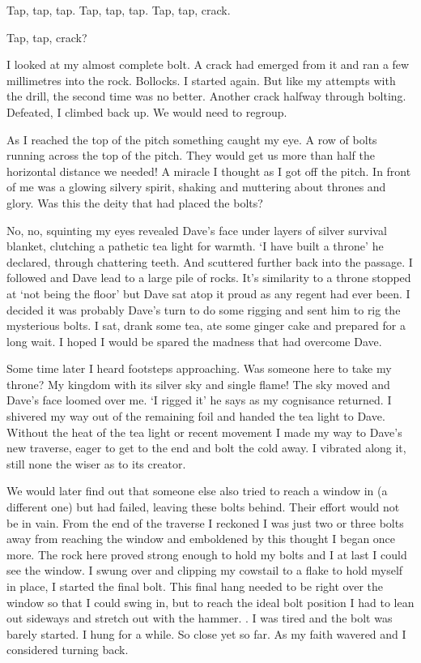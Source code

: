 Tap, tap, tap. Tap, tap, tap. Tap, tap, crack. 

Tap, tap, crack? 

I looked at my almost complete bolt. A crack had emerged from it and ran a few millimetres into the rock. Bollocks. I started again. But like my attempts with the drill, the second time was no better. Another crack halfway through bolting. Defeated, I climbed back up. We would need to regroup.

As I reached the top of the pitch something caught my eye. A row of bolts running across the top of the pitch. They would get us more than half the horizontal distance we needed! A miracle I thought as I got off the pitch. In front of me was a glowing silvery spirit, shaking and muttering about thrones and glory. Was this the deity that had placed the bolts? 

No, no, squinting my eyes revealed Dave's face under layers of silver survival blanket, clutching a pathetic tea light for warmth. `I have built a throne' he declared, through chattering teeth. And scuttered further back into the passage. I followed and Dave lead to a large pile of rocks. It's similarity to a throne stopped at `not being the floor' but Dave sat atop it proud as any regent had ever been. I decided it was probably Dave's turn to do some rigging and sent him to rig the mysterious bolts. I sat, drank some tea, ate some ginger cake and prepared for a long wait. I hoped I would be spared the madness that had overcome Dave.



Some time later I heard footsteps approaching. Was someone here to take my throne? My kingdom with its silver sky and single flame! The sky moved and Dave's face loomed over me.  `I rigged it' he says as my cognisance returned. I shivered my way out of the remaining foil and handed the tea light to Dave. Without the heat of the tea light or recent movement I made my way to Dave's new traverse, eager to get to the end and bolt the cold away. I vibrated along it, still none the wiser as to its creator. 

We would later find out that someone else also tried to reach a window in  (a different one) but had failed, leaving these bolts behind. Their effort would not be in vain. From the end of the traverse I reckoned I was just two or three bolts away from reaching the window and emboldened by this thought I began once more. The rock here proved strong enough to hold my bolts and I at last I could see the window. I swung over and clipping my cowstail to a flake to hold myself in place, I started the final bolt. This final hang needed to be right over the window so that I could swing in, but to reach the ideal bolt position I had to lean out sideways and stretch out with the hammer. . I was tired and the bolt was barely started. I hung for a while. So close yet so far. As my faith wavered and I considered turning back.

